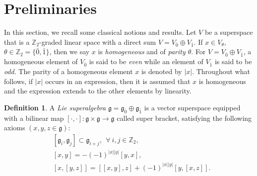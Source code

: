 \documentclass[12pt]{article}
\numberwithin{equation}{section}
\theoremstyle{definition}
\newtheorem{definition}[theorem]{Definition}
\theoremstyle{plain}
\newcommand{\bZz}{\ensuremath{\mathbb{Z}_2}}
\newcommand{\ep}{\ensuremath{{\bar{0}}}}
\newcommand{\op}{\ensuremath{{\bar{1}}}}
\newcommand{\fg}{\mathfrak{g}}
\begin{document}
\section{Preliminaries}\label{sect:prelim}
\hspace{1.5em}In this section, we recall some classical notions and results. Let $V$ be a superspace that is a \bZz-graded linear space with a direct sum $V=V_\ep \oplus V_\op$. If $x\in V_\theta$, $\theta\in\bZz=\{\ep,\op\}$, then we say $x$ is \emph{homogeneous} and of \emph{parity $\theta$}. For $V=V_\ep\oplus V_\op$, a homogeneous element of $V_\ep$ is said to be \emph{even} while an element of $V_\op$ is said to be \emph{odd}. The parity of a homogeneous element $x$ is denoted by $|x|$. Throughout what follows, if $|x|$ occurs in an expression, then it is assumed that $x$ is homogeneous and the expression extends to the other elements by linearity. 


\begin{definition}
    A \emph{Lie superalgebra} $\fg=\fg_\ep\oplus\fg_\op$ is a vector superspace equipped with a bilinear map $[\cdot,\cdot]:\fg\times\fg\rightarrow\fg$ called super bracket, satisfying the following axioms $(x,y,z\in\fg)$:
    \begin{align*}
        &[\fg_i,\fg_j]\subset\fg_{i+j},\ \ \forall\ i,j\in\bZz,\\
        &[x,y]=-(-1)^{|x||y|}[y,x],\\
        &[x,[y,z]]=[[x,y],z]+(-1)^{|x||y|}[y,[x,z]].
    \end{align*}
\end{definition}
\end{document}
